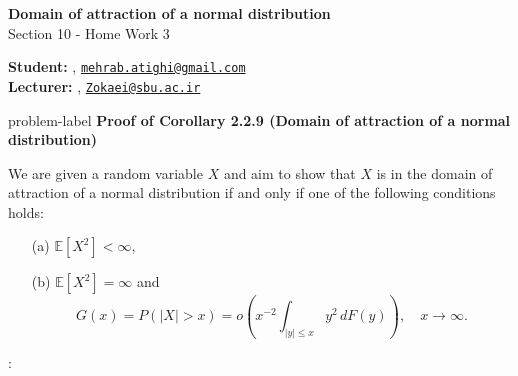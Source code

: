 	






		\begin{Large}
		\textsf{\textbf{Domain of attraction of a normal distribution}}\\
		Section 10 - Home Work 3
	\end{Large}
	
	\vspace{1ex}
	
	\textsf{\textbf{Student:}} , \href{mailto:mehrab.atighi@gmail.com}{\texttt{mehrab.atighi@gmail.com}}\\
	\textsf{\textbf{Lecturer:}} , \href{mailto:Zokaei@sbu.ac.ir}{\texttt{Zokaei@sbu.ac.ir}}
	
	
	\vspace{2ex}
	
	\begin{problem}{}{problem-label}
		\textbf{Proof of Corollary 2.2.9 (Domain of attraction of a normal distribution)}
		
		We are given a random variable \( X \) and aim to show that \( X \) is in the domain of attraction of a normal distribution if and only if one of the following conditions holds:
		\begin{enumerate}
			\item[(a)] \( \mathbb{E}[X^2] < \infty \),
			\item[(b)] \( \mathbb{E}[X^2] = \infty \) and 
			\[
			G(x) = P(|X| > x) = o \left( x^{-2} \int_{|y| \leq x} y^2 \, dF(y) \right), \quad x \to \infty.
			\]
		\end{enumerate}
		\cite{Embrechts.etal1997}:
	\end{problem}
	
